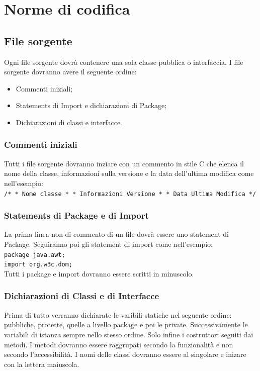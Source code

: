 \documentclass[11pt,titlepage,a4paper]{report}
\begin{document}
\chapter{Norme di codifica}
\section{File sorgente}
Ogni file sorgente dovr\`a contenere una sola classe pubblica o interfaccia. I file sorgente dovranno avere il seguente ordine:
\begin{itemize}
\item Commenti iniziali;
\item Statements di Import e dichiarazioni di Package;
\item Dichiarazioni di classi e interfacce.
\end{itemize}
\subsection{Commenti iniziali}
Tutti i file sorgente dovranno inziare con un commento in stile C che elenca il nome della classe, informazioni sulla versione e la data dell'ultima modifica come nell'esempio: \\
 \newline
\texttt{/* \newline
* Nome classe \newline
* \newline
* Informazioni Versione \newline
* \newline
* Data Ultima Modifica \newline
*/ \\}
 \newline
\subsection{Statements di Package e di Import}
La prima linea non di commento di un file dovr\`a essere uno statement di Package. Seguiranno poi gli statement di import come nell'esempio: \\
 \newline
\texttt{package java.awt; \\ 
import org.w3c.dom; \\}
Tutti i package e import dovranno essere scritti in minuscolo.
\subsection{Dichiarazioni di Classi e di Interfacce}
Prima di tutto verranno dichiarate le varibili statiche nel seguente ordine: pubbliche, protette, quelle a livello package e poi le private. Successivamente le variabili di istanza sempre nello stesso ordine. Solo infine i costruttori seguiti dai metodi. I metodi dovranno essere raggrupati secondo la funzionalit\`a e non secondo l'accessibilit\`a. I nomi delle classi dovranno essere al singolare e inizare con la lettera maiuscola.
\end{document}

